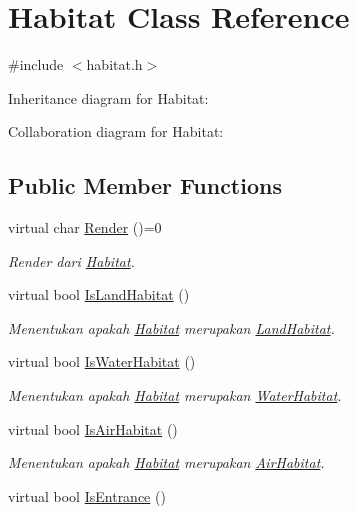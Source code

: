 \hypertarget{classHabitat}{}\section{Habitat Class Reference}
\label{classHabitat}


{\ttfamily \#include $<$habitat.\+h$>$}



Inheritance diagram for Habitat\+:


Collaboration diagram for Habitat\+:
\subsection*{Public Member Functions}
\begin{DoxyCompactItemize}
\item 
virtual char \hyperlink{classHabitat_ad1bf10205d38e8e308eb9acc3aa2872c}{Render} ()=0
\begin{DoxyCompactList}\small\item\em Render dari \hyperlink{classHabitat}{Habitat}. \end{DoxyCompactList}\item 
virtual bool \hyperlink{classHabitat_aaf69aab7e1ce1075188651d2cb388b6b}{Is\+Land\+Habitat} ()
\begin{DoxyCompactList}\small\item\em Menentukan apakah \hyperlink{classHabitat}{Habitat} merupakan \hyperlink{classLandHabitat}{Land\+Habitat}. \end{DoxyCompactList}\item 
virtual bool \hyperlink{classHabitat_acfdb3e3911d536c5564c91d60c368fc4}{Is\+Water\+Habitat} ()
\begin{DoxyCompactList}\small\item\em Menentukan apakah \hyperlink{classHabitat}{Habitat} merupakan \hyperlink{classWaterHabitat}{Water\+Habitat}. \end{DoxyCompactList}\item 
virtual bool \hyperlink{classHabitat_aef29f87fdc6be7ae4e44279d816e173b}{Is\+Air\+Habitat} ()
\begin{DoxyCompactList}\small\item\em Menentukan apakah \hyperlink{classHabitat}{Habitat} merupakan \hyperlink{classAirHabitat}{Air\+Habitat}. \end{DoxyCompactList}\item 
virtual bool \hyperlink{classHabitat_aedc03784a83bef591a2441d1c062cd57}{Is\+Entrance} ()

\end{DoxyCompactItemize}
